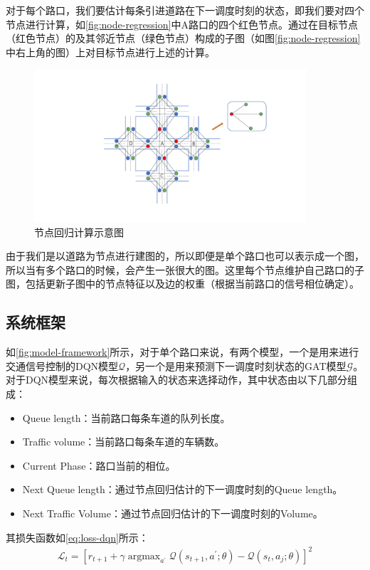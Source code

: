 对于每个路口，我们要估计每条引进道路在下一调度时刻的状态，即我们要对四个节点进行计算，如\autoref{fig:node-regression}中A路口的四个红色节点。通过在目标节点（红色节点）的及其邻近节点（绿色节点）构成的子图（如图\autoref{fig:node-regression}中右上角的图）上对目标节点进行上述的计算。
\begin{figure}[htb]
  \includegraphics[width=0.9\textwidth]{fig/node-regression.pdf}
  \caption{节点回归计算示意图}
  \label{fig:node-regression}
\end{figure}
由于我们是以道路为节点进行建图的，所以即便是单个路口也可以表示成一个图，所以当有多个路口的时候，会产生一张很大的图。这里每个节点维护自己路口的子图，包括更新子图中的节点特征以及边的权重（根据当前路口的信号相位确定）。

\subsection{系统框架}
如\autoref{fig:model-framework}所示，对于单个路口来说，有两个模型，一个是用来进行交通信号控制的DQN模型$\mathcal{Q}$，另一个是用来预测下一调度时刻状态的GAT模型$\mathcal{G}$。
对于DQN模型来说，每次根据输入的状态来选择动作，其中状态由以下几部分组成：
\begin{itemize}
  \item Queue length：当前路口每条车道的队列长度。
  \item Traffic volume：当前路口每条车道的车辆数。
  \item Current Phase：路口当前的相位。
  \item Next Queue length：通过节点回归估计的下一调度时刻的Queue length。
  \item Next Traffic Volume：通过节点回归估计的下一调度时刻的Volume。
\end{itemize}
其损失函数如\autoref{eq:loss-dqn}所示：
\begin{align}
  \label{eq:loss-dqn}
  \mathcal{L}_t=[ r_{t+1}+\gamma \mathop{\arg\max}_{a^{\prime}} \mathcal{Q}(s_{t+1},a^{'};\theta)-\mathcal{Q}(s_t,a_j;\theta)]^2
\end{align}

